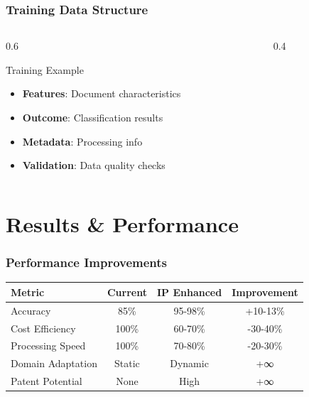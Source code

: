 \documentclass{beamer}
\begin{document}
\begin{frame}
\frametitle{Training Data Structure}
\begin{columns}
\begin{column}{0.6\textwidth}
\begin{block}{Training Example}
\begin{itemize}
\item \textbf{Features}: Document characteristics
\item \textbf{Outcome}: Classification results
\item \textbf{Metadata}: Processing info
\item \textbf{Validation}: Data quality checks
\end{itemize}
\end{block}
\end{column}
\begin{column}{0.4\textwidth}
\begin{center}
\end{center}
\end{column}
\end{columns}
\end{frame}

\section{Results \& Performance}

\begin{frame}
\frametitle{Performance Improvements}
\begin{table}[h]
\centering
\begin{tabular}{@{}lccc@{}}
\toprule
\textbf{Metric} & \textbf{Current} & \textbf{IP Enhanced} & \textbf{Improvement} \\
\midrule
Accuracy & 85\% & 95-98\% & +10-13\% \\
Cost Efficiency & 100\% & 60-70\% & -30-40\% \\
Processing Speed & 100\% & 70-80\% & -20-30\% \\
Domain Adaptation & Static & Dynamic & +∞ \\
Patent Potential & None & High & +∞ \\
\bottomrule
\end{tabular}
\end{table}
\end{frame}
\end{document}
